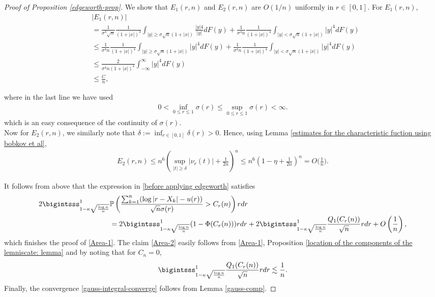 \documentclass[9pt,a4paper,reqno]{amsart}
\theoremstyle{mine}
\theoremstyle{definition}
\theoremstyle{remark}
\begin{document}
\begin{proof}[Proof of Proposition \ref{edgeworth-prop}]
    We show that $E_1(r,n)$ and $E_2(r,n)$ are $O(1/n)$ uniformly in $r\in [0,1]$. For $E_1(r,n)$, 
\begin{align}\label{bound on E_1(r,n)}
    &|E_1(r,n)| \\
    & = \frac{1}{\sigma^3 \sqrt{n}} \frac{1}{(1+|x|)^3} \int_{|y|\geq \sigma\sqrt{n}(1+|x|)} \frac{|y|4}{|y|} dF(y)+\frac{1}{\sigma^4{n}} \frac{1}{(1+|x|)^4} \int_{|y|< \sigma\sqrt{n}(1+|x|)}  |y|^4 dF(y) \nonumber\\[1em]
    &\leq \frac{1}{\sigma^4 {n}} \frac{1}{(1+|x|)^4} \int_{|y|\geq \sigma\sqrt{n}(1+|x|)}|y|^4 dF(y)+\frac{1}{\sigma^4{n}}\frac{1}{(1+|x|)^4} \int_{|y|< \sigma\sqrt{n}(1+|x|)}  |y|^4 dF(y) \nonumber\\[1em]
     &\leq \frac{2}{\sigma^4 {n}(1+|x|)^4} \int_{-\infty}^{\infty}|y|^4 dF(y)  \nonumber\\[1em]
     &\leq \frac{C}{{n}},
\end{align}

    where in the last line we have used \begin{align}\label{bound on sigma}
        0< \inf_{0\leq r \leq 1} \sigma(r) \leq \sup_{0\leq r \leq 1} \sigma(r) < \infty.
    \end{align}
    which is an easy consequence of the continuity of $\sigma(r)$. \\

    Now for $E_2(r,n)$, we similarly note that $\delta := \inf_{r\in [0,1]} \delta(r) >0$. Hence, using Lemma \ref{estimates for the characteristic fuction using bobkov et al}, 
    \begin{align}\label{bound on E_2(r,n)}
        E_2(r,n) \leq n^6 \left( \sup_{|t|\geq \delta} |\nu_r(t)|+\frac{1}{2n}\right)^n \leq  n^6 \left( 1 - \eta +\frac{1}{2n}\right)^n = O\biggl(\frac{1}{n}\biggr).
    \end{align}
      
It follows from above that the expression in \eqref{before applying edgeworth} satisfies 
\begin{align}\label{afermath-edgeworth}
   2 \bigintsss_{ 1- \kappa\sqrt{\frac{\log n}{n}}}^1 &\mathbb{P}\left(\frac{\sum_{k=1}^n(\log|r-X_k|- u(r))}{\sqrt{n}\sigma(r)} > C_r(n)\right)rdr  \nonumber \\ &=  2 \bigintsss_{ 1- \kappa\sqrt{\frac{\log n}{n}}}^1 (1- \Phi(C_r(n)))rdr + 2 \bigintsss_{ 1- \kappa\sqrt{\frac{\log n}{n}}}^1 \frac{Q_1(C_r(n))}{\sqrt{n}}rdr + O\left(\frac{1}{n} \right),
\end{align}
which finishes the proof of \eqref{Area-1}. The claim \eqref{Area-2} easily follows from \eqref{Area-1}, Proposition \ref{location of the components of the lemniscate: lemma} and by noting that for $C_n=0$, 
\[ \bigintsss_{ 1- \kappa\sqrt{\frac{\log n}{n}}}^1 \frac{Q_1(C_r(n))}{\sqrt{n}}rdr \lesssim \frac{1}{n}. \]
Finally, the convergence \eqref{gauss-integral-converge} follows from Lemma \ref{gauss-comp}.
\end{proof}
\end{document}
